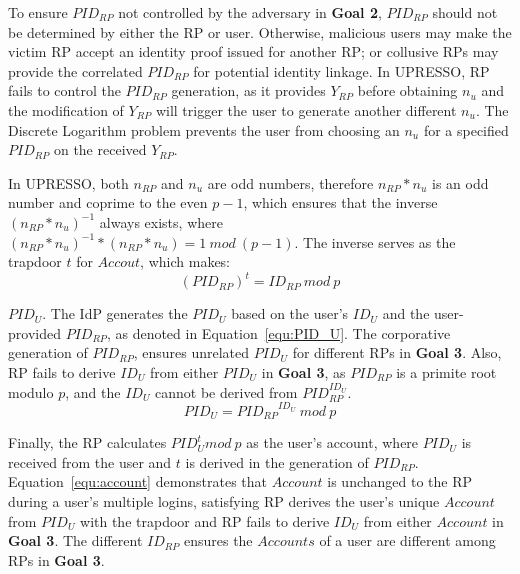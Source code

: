 To ensure $PID_{RP}$ not controlled by the adversary in \textbf{Goal 2},
 $PID_{RP}$ should not be determined by  either the RP or user. %
Otherwise, malicious users may make the victim RP accept an identity proof issued for another RP; or collusive RPs may provide the correlated $PID_{RP}$ for potential identity linkage.
In UPRESSO, RP fails to control the $PID_{RP}$ generation, as it provides $Y_{RP}$ before obtaining $n_{u}$ and the modification of $Y_{RP}$ will trigger the user to generate another different  $n_{u}$. The Discrete Logarithm problem prevents the user from choosing an $n_{u}$ for a specified $PID_{RP}$ on the received $Y_{RP}$.

In UPRESSO, both $n_{RP}$ and $n_{u}$ are odd numbers, therefore $n_{RP}*n_{u}$ is an odd number and coprime to the even $p-1$, which ensures that the inverse $(n_{RP}*n_{u})^{-1}$ always exists, where  $(n_{RP}*n_{u})^{-1} * (n_{RP}*n_{u}) = 1 \ mod \ (p-1)$. The inverse  serves as  the trapdoor $t$ for $Accout$, which makes:
\begin{equation}
(PID_{RP})^t = ID_{RP} \ mod \ p
\label{equ:trapdoor}
\end{equation}


\noindent\textbf{$PID_U$}. The IdP generates the $PID_U$ based on the user's $ID_U$ and the user-provided $PID_{RP}$, as denoted in Equation~\ref{equ:PID_U}.
The corporative generation of $PID_{RP}$, ensures unrelated $PID_U$  for different RPs in \textbf{Goal 3}. Also, RP fails to derive $ID_U$ from either $PID_U$ in \textbf{Goal 3}, as
   $PID_{RP}$ is a primite root modulo $p$, and the $ID_U$ cannot be derived from $PID_{RP}^{ID_U}$.
\begin{equation}
 PID_U = {PID_{RP}}^{ID_U} \ mod \ p
 \label{equ:PID_U}
\end{equation}

Finally, the RP calculates $PID_U^t mod \ p$ as the  user's account, where $PID_U$ is received from the user and $t$ is derived in the generation of $PID_{RP}$. Equation~\ref{equ:account} demonstrates that $Account$ is unchanged to the RP during a user's multiple logins, satisfying RP derives the user's unique $Account$  from $PID_U$ with the  trapdoor and  RP fails to derive $ID_U$ from either $Account$ in \textbf{Goal 3}. The different $ID_{RP}$ ensures the $Accounts$ of a user are different among RPs in \textbf{Goal 3}.


